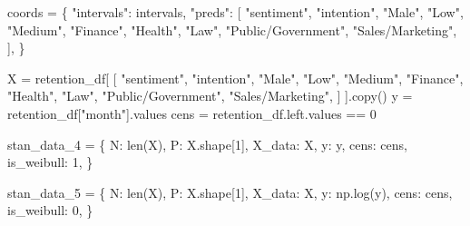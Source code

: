 \documentclass[
  letterpaper,
  DIV=11,
  numbers=noendperiod]{scrartcl}
\newenvironment{Shaded}{\begin{snugshade}}{\end{snugshade}}
\newcommand{\BuiltInTok}[1]{\textcolor[rgb]{0.00,0.23,0.31}{#1}}
\newcommand{\DecValTok}[1]{\textcolor[rgb]{0.68,0.00,0.00}{#1}}
\newcommand{\NormalTok}[1]{\textcolor[rgb]{0.00,0.23,0.31}{#1}}
\newcommand{\OperatorTok}[1]{\textcolor[rgb]{0.37,0.37,0.37}{#1}}
\newcommand{\StringTok}[1]{\textcolor[rgb]{0.13,0.47,0.30}{#1}}
\begin{document}
\begin{Shaded}
\begin{Highlighting}[]
\NormalTok{coords }\OperatorTok{=}\NormalTok{ \{}
    \StringTok{"intervals"}\NormalTok{: intervals,}
    \StringTok{"preds"}\NormalTok{: [}
        \StringTok{"sentiment"}\NormalTok{,}
        \StringTok{"intention"}\NormalTok{,}
        \StringTok{"Male"}\NormalTok{,}
        \StringTok{"Low"}\NormalTok{,}
        \StringTok{"Medium"}\NormalTok{,}
        \StringTok{"Finance"}\NormalTok{,}
        \StringTok{"Health"}\NormalTok{,}
        \StringTok{"Law"}\NormalTok{,}
        \StringTok{"Public/Government"}\NormalTok{,}
        \StringTok{"Sales/Marketing"}\NormalTok{,}
\NormalTok{    ],}
\NormalTok{\}}

\NormalTok{X }\OperatorTok{=}\NormalTok{ retention\_df[}
\NormalTok{    [}
        \StringTok{"sentiment"}\NormalTok{,}
        \StringTok{"intention"}\NormalTok{,}
        \StringTok{"Male"}\NormalTok{,}
        \StringTok{"Low"}\NormalTok{,}
        \StringTok{"Medium"}\NormalTok{,}
        \StringTok{"Finance"}\NormalTok{,}
        \StringTok{"Health"}\NormalTok{,}
        \StringTok{"Law"}\NormalTok{,}
        \StringTok{"Public/Government"}\NormalTok{,}
        \StringTok{"Sales/Marketing"}\NormalTok{,}
\NormalTok{    ]}
\NormalTok{].copy()}
\NormalTok{y }\OperatorTok{=}\NormalTok{ retention\_df[}\StringTok{"month"}\NormalTok{].values}
\NormalTok{cens }\OperatorTok{=}\NormalTok{ retention\_df.left.values }\OperatorTok{==} \DecValTok{0}

\NormalTok{stan\_data\_4 }\OperatorTok{=}\NormalTok{ \{}
  \StringTok{\textquotesingle{}N\textquotesingle{}}\NormalTok{: }\BuiltInTok{len}\NormalTok{(X),}
  \StringTok{\textquotesingle{}P\textquotesingle{}}\NormalTok{: X.shape[}\DecValTok{1}\NormalTok{],}
  \StringTok{\textquotesingle{}X\_data\textquotesingle{}}\NormalTok{: X,}
  \StringTok{\textquotesingle{}y\textquotesingle{}}\NormalTok{: y,}
  \StringTok{\textquotesingle{}cens\textquotesingle{}}\NormalTok{: cens,}
  \StringTok{\textquotesingle{}is\_weibull\textquotesingle{}}\NormalTok{: }\DecValTok{1}\NormalTok{,}
\NormalTok{\}}

\NormalTok{stan\_data\_5 }\OperatorTok{=}\NormalTok{ \{}
  \StringTok{\textquotesingle{}N\textquotesingle{}}\NormalTok{: }\BuiltInTok{len}\NormalTok{(X),}
  \StringTok{\textquotesingle{}P\textquotesingle{}}\NormalTok{: X.shape[}\DecValTok{1}\NormalTok{],}
  \StringTok{\textquotesingle{}X\_data\textquotesingle{}}\NormalTok{: X,}
  \StringTok{\textquotesingle{}y\textquotesingle{}}\NormalTok{: np.log(y),}
  \StringTok{\textquotesingle{}cens\textquotesingle{}}\NormalTok{: cens,}
  \StringTok{\textquotesingle{}is\_weibull\textquotesingle{}}\NormalTok{: }\DecValTok{0}\NormalTok{,}
\NormalTok{\}}


\end{Highlighting}
\end{Shaded}
\end{document}
